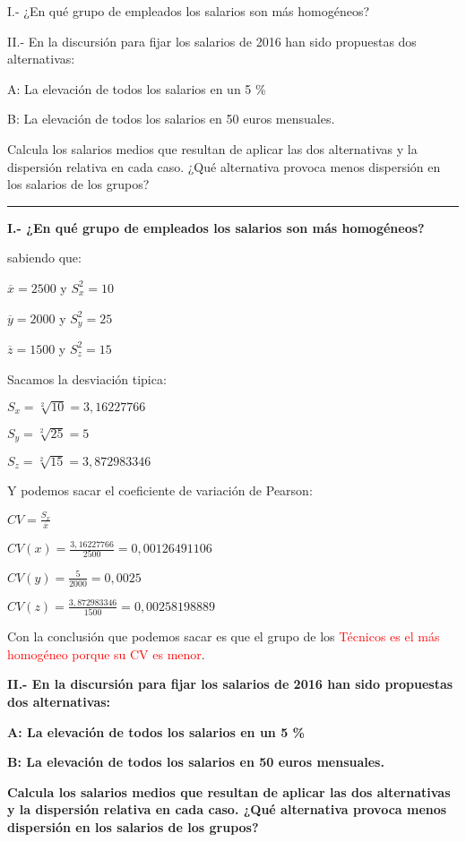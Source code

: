 \documentclass{article}
\begin{document}
I.- ¿En qu\'e grupo de empleados los salarios son m\'as homog\'eneos?

II.- En la discursi\'on para fijar los salarios de 2016 han sido propuestas dos alternativas:

	A: La elevaci\'on de todos los salarios en un 5 \%
	
	B: La elevaci\'on de todos los salarios en 50 euros mensuales.

Calcula los salarios medios que resultan de aplicar las dos alternativas y la dispersi\'on relativa en cada caso. ¿Qu\'e alternativa provoca menos dispersi\'on en los salarios de los grupos?

\rule{119mm}{0.2mm}

\textbf{I.- ¿En qu\'e grupo de empleados los salarios son m\'as homog\'eneos?}

sabiendo que:

\(\overline{x} = 2500\) y \( S_{x}^2 = 10\)

\(\overline{y} = 2000\) y \(S_{y}^2 = 25\)

\(\overline{z} = 1500\) y \(S_{z}^2 = 15\)


Sacamos la desviaci\'on tipica:

\(S_{x} = \sqrt[2]{10} = 3,16227766\)

\(S_{y} = \sqrt[2]{25} = 5\)

\(S_{z} = \sqrt[2]{15} = 3,872983346\)

Y podemos sacar el coeficiente de variaci\'on de Pearson:

\(CV = \frac{S_{x}}{\overline{x}}\)

\(CV(x) = \frac{3,16227766}{2500} = 0,00126491106\) 

\(CV(y) = \frac{5}{2000} = 0,0025\) 

\(CV(z) = \frac{3,872983346}{1500} = 0,00258198889\)  

Con la conclusi\'on que podemos sacar es que el grupo de los \textcolor{red}{T\'ecnicos es el m\'as homog\'eneo porque su CV es menor}.

\textbf{II.- En la discursi\'on para fijar los salarios de 2016 han sido propuestas dos alternativas:}

	\textbf{A: La elevaci\'on de todos los salarios en un 5 \%}
	
	\textbf{B: La elevaci\'on de todos los salarios en 50 euros mensuales.}

\textbf{Calcula los salarios medios que resultan de aplicar las dos alternativas y la dispersi\'on relativa en cada caso. ¿Qu\'e alternativa provoca menos dispersi\'on en los salarios de los grupos?}
\end{document}
